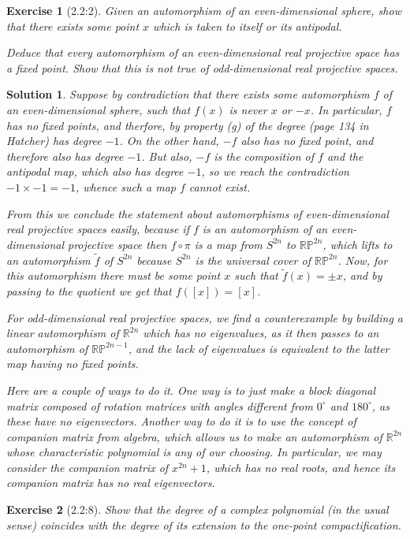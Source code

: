 \documentclass{article}
\theoremstyle{plain}
\newtheorem*{ex}{Exercise}
\theoremstyle{nonumberplain}
\newtheorem{sol}{Solution}
\newcommand{\R}{\mathbb{R}}
\newcommand{\PP}{\mathbb{P}}
\begin{document}
\begin{ex}[2.2:2]
Given an automorphism of an even-dimensional sphere, show that there exists some point $x$ which is taken to itself or its antipodal.

Deduce that every automorphism of an even-dimensional real projective space has a fixed point. Show that this is not true of odd-dimensional real projective spaces.
\end{ex}

\begin{sol}
Suppose by contradiction that there exists some automorphism $f$ of an even-dimensional sphere, such that $f(x)$ is never $x$ or $-x$. In particular, $f$ has no fixed points, and therfore, by property (g) of the degree (page 134 in Hatcher) has degree $-1$. On the other hand, $-f$ also has no fixed point, and therefore also has degree $-1$. But also, $-f$ is the composition of $f$ and the antipodal map, which also has degree $-1$, so we reach the contradiction $-1 \times -1 = -1$, whence such a map $f$ cannot exist.

From this we conclude the statement about automorphisms of even-dimensional real projective spaces easily, because if $f$ is an automorphism of an even-dimensional projective space then $f \circ \pi$ is a map from $S^{2n}$ to $\R \PP^{2n}$, which lifts to an automorphism $\tilde f$ of $S^{2n}$ because $S^{2n}$ is the universal cover of $\R \PP^{2n}$. Now, for this automorphism there must be some point $x$ such that $\tilde f(x) = \pm x$, and by passing to the quotient we get that $f([x]) = [x]$.

For odd-dimensional real projective spaces, we find a counterexample by building a linear automorphism of $\R^{2n}$ which has no eigenvalues, as it then passes to an automorphism of $\R \PP^{2n-1}$, and the lack of eigenvalues is equivalent to the latter map having no fixed points.

Here are a couple of ways to do it. One way is to just make a block diagonal matrix composed of rotation matrices with angles different from $0^\circ$ and $180^\circ$, as these have no eigenvectors. Another way to do it is to use the concept of companion matrix from algebra, which allows us to make an automorphism of $\R^{2n}$ whose characteristic polynomial is any of our choosing. In particular, we may consider the companion matrix of $x^{2n} + 1$, which has no real roots, and hence its companion matrix has no real eigenvectors.
\end{sol}

\begin{ex}[2.2:8]
Show that the degree of a complex polynomial (in the usual sense) coincides with the degree of its extension to the one-point compactification.
\end{ex}
\end{document}
